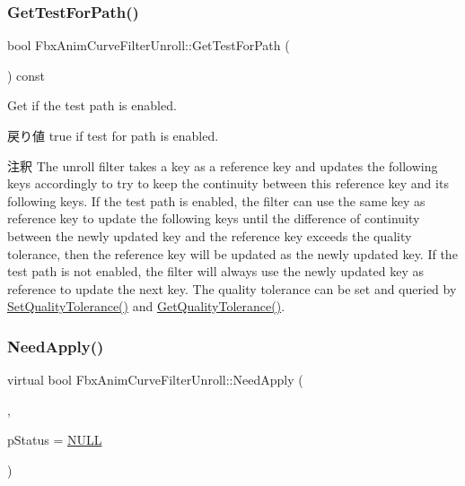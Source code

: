 \subsubsection{\texorpdfstring{Get\+Test\+For\+Path()}{GetTestForPath()}}
{\footnotesize\ttfamily bool Fbx\+Anim\+Curve\+Filter\+Unroll\+::\+Get\+Test\+For\+Path (\begin{DoxyParamCaption}{ }\end{DoxyParamCaption}) const}

Get if the test path is enabled. \begin{DoxyReturn}{戻り値}
{\ttfamily true} if test for path is enabled. 
\end{DoxyReturn}
\begin{DoxyRemark}{注釈}
The unroll filter takes a key as a reference key and updates the following keys accordingly to try to keep the continuity between this reference key and its following keys. If the test path is enabled, the filter can use the same key as reference key to update the following keys until the difference of continuity between the newly updated key and the reference key exceeds the quality tolerance, then the reference key will be updated as the newly updated key. If the test path is not enabled, the filter will always use the newly updated key as reference to update the next key. The quality tolerance can be set and queried by \hyperlink{class_fbx_anim_curve_filter_unroll_ad8570bf12f5c397fb975fe961aeed29f}{Set\+Quality\+Tolerance()} and \hyperlink{class_fbx_anim_curve_filter_unroll_a881a4c7122073deec59ab208b2bdf95a}{Get\+Quality\+Tolerance()}. 
\end{DoxyRemark}
\mbox{\label{class_fbx_anim_curve_filter_unroll_a8380c6817fbf19d347b0bd0b5ae9a57b}} 
\subsubsection{\texorpdfstring{Need\+Apply()}{NeedApply()}\hspace{0.1cm}{\footnotesize\ttfamily [1/5]}}
{\footnotesize\ttfamily virtual bool Fbx\+Anim\+Curve\+Filter\+Unroll\+::\+Need\+Apply (\begin{DoxyParamCaption}\item[{\hyperlink{class_fbx_anim_stack}{Fbx\+Anim\+Stack} $\ast$}]{,  }\item[{\hyperlink{class_fbx_status}{Fbx\+Status} $\ast$}]{p\+Status = {\ttfamily \hyperlink{fbxarch_8h_a070d2ce7b6bb7e5c05602aa8c308d0c4}{N\+U\+LL}} }\end{DoxyParamCaption})\hspace{0.3cm}{\ttfamily [virtual]}}

